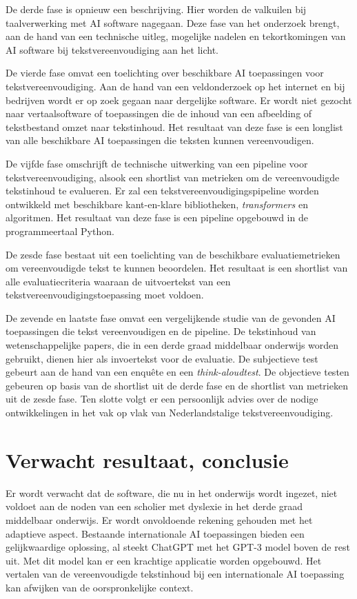De derde fase is opnieuw een beschrijving. Hier worden de valkuilen bij taalverwerking met AI software nagegaan. Deze fase van het onderzoek brengt, aan de hand van een technische uitleg, mogelijke nadelen en tekortkomingen van AI software bij tekstvereenvoudiging aan het licht.

De vierde fase omvat een toelichting over beschikbare AI toepassingen voor tekstvereenvoudiging. Aan de hand van een veldonderzoek op het internet en bij bedrijven wordt er op zoek gegaan naar dergelijke software. Er wordt niet gezocht naar vertaalsoftware of toepassingen die de inhoud van een afbeelding of tekstbestand omzet naar tekstinhoud. Het resultaat van deze fase is een longlist van alle beschikbare AI toepassingen die teksten kunnen vereenvoudigen.

De vijfde fase omschrijft de technische uitwerking van een pipeline voor tekstvereenvoudiging, alsook een shortlist van metrieken om de vereenvoudigde tekstinhoud te evalueren. Er zal een tekstvereenvoudigingspipeline worden ontwikkeld met beschikbare kant-en-klare bibliotheken, \textit{transformers} en algoritmen. Het resultaat van deze fase is een pipeline opgebouwd in de programmeertaal Python. 

De zesde fase bestaat uit een toelichting van de beschikbare evaluatiemetrieken om vereenvoudigde tekst te kunnen beoordelen. Het resultaat is een shortlist van alle evaluatiecriteria waaraan de uitvoertekst van een tekstvereenvoudigingstoepassing moet voldoen.

De zevende en laatste fase omvat een vergelijkende studie van de gevonden AI toepassingen die tekst vereenvoudigen en de pipeline. De tekstinhoud van wetenschappelijke papers, die in een derde graad middelbaar onderwijs worden gebruikt, dienen hier als invoertekst voor de evaluatie. De subjectieve test gebeurt aan de hand van een enquête en een \textit{think-aloudtest}. De objectieve testen gebeuren op basis van de shortlist uit de derde fase en de shortlist van metrieken uit de zesde fase. Ten slotte volgt er een persoonlijk advies over de nodige ontwikkelingen in het vak op vlak van Nederlandstalige tekstvereenvoudiging.

\section{Verwacht resultaat, conclusie}
\label{sec:verwachte_resultaten}

Er wordt verwacht dat de software, die nu in het onderwijs wordt ingezet, niet voldoet aan de noden van een scholier met dyslexie in het derde graad middelbaar onderwijs. Er wordt onvoldoende rekening gehouden met het adaptieve aspect. Bestaande internationale AI toepassingen bieden een gelijkwaardige oplossing, al steekt ChatGPT met het GPT-3 model boven de rest uit. Met dit model kan er een krachtige applicatie worden opgebouwd. Het vertalen van de vereenvoudigde tekstinhoud bij een internationale AI toepassing kan afwijken van de oorspronkelijke context.

